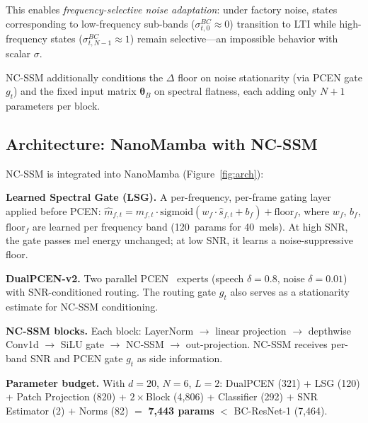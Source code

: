 \documentclass{Interspeech}
\begin{document}
This enables \emph{frequency-selective noise adaptation}:
under factory noise, states corresponding to low-frequency sub-bands ($\sigma^{BC}_{t,0}{\approx}0$) transition to LTI while high-frequency states ($\sigma^{BC}_{t,N-1}{\approx}1$) remain selective---an impossible behavior with scalar $\sigma$.

NC-SSM additionally conditions the $\Delta$ floor on noise stationarity (via PCEN gate $g_t$) and the fixed input matrix $\bm{\theta}_B$ on spectral flatness, each adding only $N{+}1$ parameters per block.

\subsection{Architecture: NanoMamba with NC-SSM}
\label{sec:arch}

NC-SSM is integrated into NanoMamba (Figure~\ref{fig:arch}):

\smallskip\noindent\textbf{Learned Spectral Gate (LSG).}
A per-frequency, per-frame gating layer applied before PCEN:
$\hat{m}_{f,t} = m_{f,t} \cdot \text{sigmoid}(w_f \cdot \hat{s}_{f,t} + b_f) + \text{floor}_f$,
where $w_f$, $b_f$, $\text{floor}_f$ are learned per frequency band (120~params for 40~mels).
At high SNR, the gate passes mel energy unchanged; at low SNR, it learns a noise-suppressive floor.

\smallskip\noindent\textbf{DualPCEN-v2.}
Two parallel PCEN~\cite{wang2017trainable} experts (speech $\delta{=}0.8$, noise $\delta{=}0.01$) with SNR-conditioned routing.
The routing gate $g_t$ also serves as a stationarity estimate for NC-SSM conditioning.

\smallskip\noindent\textbf{NC-SSM blocks.}
Each block: LayerNorm $\to$ linear projection $\to$ depthwise Conv1d $\to$ SiLU gate $\to$ NC-SSM $\to$ out-projection.
NC-SSM receives per-band SNR and PCEN gate $g_t$ as side information.

\smallskip\noindent\textbf{Parameter budget.}
With $d{=}20$, $N{=}6$, $L{=}2$: DualPCEN (321) + LSG (120) + Patch Projection (820) + $2{\times}$Block (4,806) + Classifier (292) $+$ SNR Estimator (2) $+$ Norms (82) $=$ \textbf{7,443 params} $<$ BC-ResNet-1 (7,464).
\end{document}
